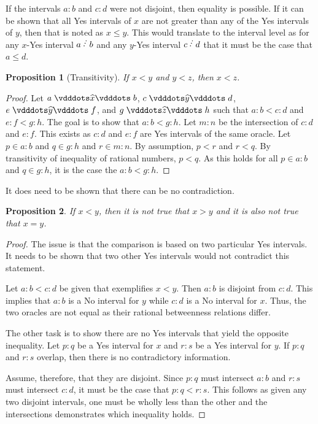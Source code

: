 \documentclass[12pt]{article}
\newtheorem{proposition}{Proposition}[section]
\begin{document}
If the intervals $a:b$ and $c:d$ were not disjoint, then equality is possible. If it can be shown that all Yes intervals of $x$ are not greater than any of the Yes intervals of $y$, then that is noted as $x \leq y$. This would translate to the interval level as for any $x$-Yes interval $a \lte b$ and any $y$-Yes interval $c \lte d$ that it must be the case that $a \leq d$. 

\begin{proposition}[Transitivity]
    If $x <y$ and $y<z$, then $x < z$.
\end{proposition}

\begin{proof}
    Let $a \xora b$, $c \xora[y] d$, $e \xora[y] f$, and $g \xora[z] h$ such that $a:b < c:d$ and $e:f < g:h$. The goal is to show that $a:b < g:h$. Let $m:n$ be the intersection of $c:d$ and $e:f$. This exists as $c:d$ and $e:f$ are Yes intervals of the same oracle. Let $p \in a:b$ and $q \in g:h$ and $r \in m:n$. By assumption, $p < r$ and $r < q$. By transitivity of inequality of rational numbers, $p < q$. As this holds for all $p \in a:b$ and $q \in g:h$, it is the case the $a:b <g:h$.
\end{proof}

It does need to be shown that there can be no contradiction. 

\begin{proposition}
    If $x < y$, then it is not true that $x > y$ and it is also not true that $x = y$.
\end{proposition}

\begin{proof}
    The issue is that the comparison is based on two particular Yes intervals. It needs to be shown that two other Yes intervals would not contradict this statement. 

    Let $a:b < c:d$ be given that exemplifies $x<y$. Then $a:b$ is disjoint from $c:d$. This implies that $a:b$ is a No interval for $y$ while $c:d$ is a No interval for $x$. Thus, the two oracles are not equal as their rational betweenness relations differ.

    The other task is to show there are no Yes intervals that yield the opposite inequality. Let $p:q$ be a Yes interval for $x$ and $r:s$ be a Yes interval for $y$. If $p:q$ and $r:s$ overlap, then there is no contradictory information. 

    Assume, therefore, that they are disjoint. Since $p:q$ must intersect $a:b$ and $r:s$ must intersect $c:d$, it must be the case that $p:q < r:s$. This follows as given any two disjoint intervals, one must be wholly less than the other and the intersections demonstrates which inequality holds. 

\end{proof}
\end{document}
